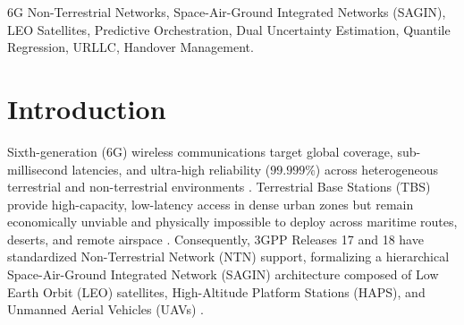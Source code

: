 \documentclass[conference]{IEEEtran}
\begin{document}
\begin{IEEEkeywords}
6G Non-Terrestrial Networks, Space-Air-Ground Integrated Networks (SAGIN), LEO Satellites, Predictive Orchestration, Dual Uncertainty Estimation, Quantile Regression, URLLC, Handover Management.
\end{IEEEkeywords}

\section{Introduction}
Sixth-generation (6G) wireless communications target global coverage, sub-millisecond latencies, and ultra-high reliability ($99.999\%$) across heterogeneous terrestrial and non-terrestrial environments \cite{you2021towards}. Terrestrial Base Stations (TBS) provide high-capacity, low-latency access in dense urban zones but remain economically unviable and physically impossible to deploy across maritime routes, deserts, and remote airspace \cite{lin20215g}. Consequently, 3GPP Releases 17 and 18 have standardized Non-Terrestrial Network (NTN) support, formalizing a hierarchical Space-Air-Ground Integrated Network (SAGIN) architecture composed of Low Earth Orbit (LEO) satellites, High-Altitude Platform Stations (HAPS), and Unmanned Aerial Vehicles (UAVs) \cite{3gpp_tr38811, 3gpp_tr38821}.
\end{document}

